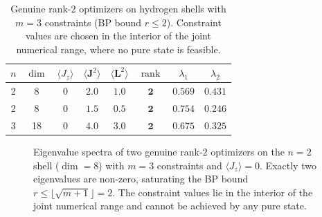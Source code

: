 \documentclass[11pt,a4paper]{article}
\theoremstyle{definition}
\newcommand{\rank}{\operatorname{rank}}
\begin{document}
\begin{table}[htbp]
\centering
\caption{Genuine rank-$2$ optimizers on hydrogen shells with $m = 3$
constraints (BP bound $r \leq 2$).  Constraint values are chosen in
the interior of the joint numerical range, where no pure state is
feasible.}
\label{tab:rank2}
\begin{tabular}{cccccccc}
\toprule
$n$ & $\dim$ & $\langle J_z\rangle$ & $\langle \mathbf{J}^2\rangle$
& $\langle \mathbf{L}^2\rangle$ & $\rank$ & $\lambda_1$ & $\lambda_2$ \\
\midrule
2 & 8  & $0$   & $2.0$ & $1.0$ & $\mathbf{2}$ & $0.569$ & $0.431$ \\
2 & 8  & $0$   & $1.5$ & $0.5$ & $\mathbf{2}$ & $0.754$ & $0.246$ \\
3 & 18 & $0$   & $4.0$ & $3.0$ & $\mathbf{2}$ & $0.675$ & $0.325$ \\
\bottomrule
\end{tabular}
\end{table}

\begin{figure}[htbp]
\centering
{}
\caption{Eigenvalue spectra of two genuine rank-$2$ optimizers on the
$n=2$ shell ($\dim=8$) with $m=3$ constraints and
$\langle J_z \rangle = 0$.  Exactly two eigenvalues are non-zero,
saturating the BP bound $r \leq \lfloor\sqrt{m+1}\rfloor = 2$.
The constraint values lie in the interior of the joint numerical range
and cannot be achieved by any pure state.}
\label{fig:rank2-eigs}
\end{figure}
\end{document}
